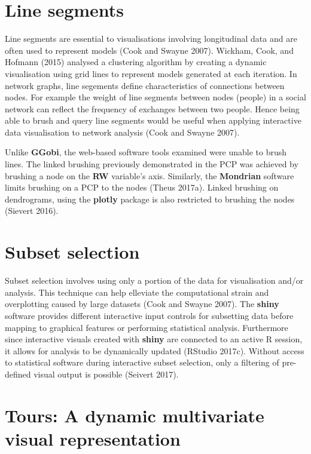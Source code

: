 \documentclass[]{book}
\theoremstyle{definition}
\theoremstyle{definition}
\theoremstyle{definition}
\theoremstyle{remark}
\begin{document}
\section{Line segments}\label{line-segments}

Line segments are essential to visualisations involving longitudinal
data and are often used to represent models (Cook and Swayne 2007).
Wickham, Cook, and Hofmann (2015) analysed a clustering algorithm by
creating a dynamic visualisation using grid lines to represent models
generated at each iteration. In network graphs, line segements define
characteristics of connections between nodes. For example the weight of
line segments between nodes (people) in a social network can reflect the
frequency of exchanges between two people. Hence being able to brush and
query line segments would be useful when applying interactive data
visualisation to network analysis (Cook and Swayne 2007).

Unlike \textbf{GGobi}, the web-based software tools examined were unable
to brush lines. The linked brushing previously demonstrated in the PCP
was achieved by brushing a node on the \textbf{RW} variable's axis.
Similarly, the \textbf{Mondrian} software limits brushing on a PCP to
the nodes (Theus 2017a). Linked brushing on dendrograms, using the
\textbf{plotly} package is also restricted to brushing the nodes
(Sievert 2016).

\section{Subset selection}\label{subset-selection}

Subset selection involves using only a portion of the data for
visualisation and/or analysis. This technique can help elleviate the
computational strain and overplotting caused by large datasets (Cook and
Swayne 2007). The \textbf{shiny} software provides different interactive
input controls for subsetting data before mapping to graphical features
or performing statistical analysis. Furthermore since interactive
visuals created with \textbf{shiny} are connected to an active R
session, it allows for analysis to be dynamically updated (RStudio
2017c). Without access to statistical software during interactive subset
selection, only a filtering of pre-defined visual output is possible
(Seivert 2017).

\section{Tours: A dynamic multivariate visual
representation}\label{tours-a-dynamic-multivariate-visual-representation}
\end{document}
